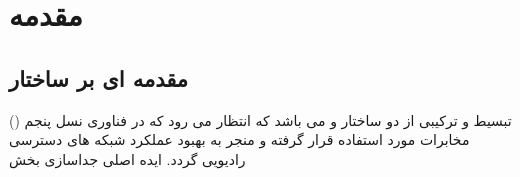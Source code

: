 \chapter{مقدمه}
\section{مقدمه ای بر ساختار }
()
تبسیط و ترکیبی از دو ساختار  و  می باشد که انتظار می رود که در فناوری نسل پنجم مخابرات مورد استفاده قرار گرفته و منجر به بهبود عملکرد شبکه های دسترسی رادیویی  گردد. 
ایده اصلی  جداسازی بخش  
